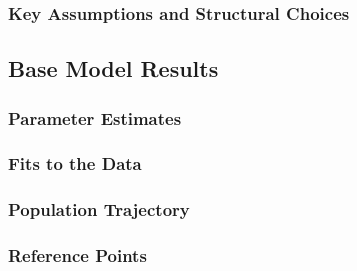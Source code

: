 \documentclass[11pt,
  english,
  a4paper,
]{article}
\begin{document}

\hypertarget{key-assumptions-and-structural-choices}{%
\subsubsection{Key Assumptions and Structural Choices}\label{key-assumptions-and-structural-choices}}

\leavevmode\tagmcend\tagstructend


\hypertarget{base-model-results}{%
\subsection{Base Model Results}\label{base-model-results}}

\leavevmode\tagmcend\tagstructend


\hypertarget{parameter-estimates}{%
\subsubsection{Parameter Estimates}\label{parameter-estimates}}

\leavevmode\tagmcend\tagstructend


\hypertarget{fits-to-the-data}{%
\subsubsection{Fits to the Data}\label{fits-to-the-data}}

\leavevmode\tagmcend\tagstructend


\hypertarget{population-trajectory}{%
\subsubsection{Population Trajectory}\label{population-trajectory}}

\leavevmode\tagmcend\tagstructend


\hypertarget{reference-points-2}{%
\subsubsection{Reference Points}\label{reference-points-2}}
\end{document}
